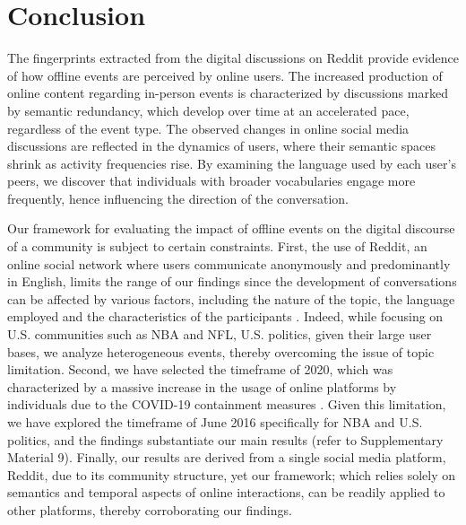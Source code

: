 \documentclass[fleqn,10pt]{wlscirep}
\begin{document}
\section*{Conclusion}

The fingerprints extracted from the digital discussions on Reddit provide evidence of how offline events are perceived by online users.
The increased production of online content regarding in-person events is characterized by discussions marked by semantic redundancy, which develop over time at an accelerated pace, regardless of the event type.
The observed changes in online social media discussions are reflected in the dynamics of users, where their semantic spaces shrink as activity frequencies rise.
By examining the language used by each user's peers, we discover that individuals with broader vocabularies engage more frequently, hence influencing the direction of the conversation. 

Our framework for evaluating the impact of offline events on the digital discourse of a community is subject to certain constraints.
First, the use of Reddit, an online social network where users communicate anonymously and predominantly in English, limits the range of our findings since the development of conversations can be affected by various factors, including the nature of the topic, the language employed and the characteristics of the participants \cite{stans2017role}.
Indeed, while focusing on U.S. communities such as NBA and NFL, U.S. politics, given their large user bases, we analyze heterogeneous events, thereby overcoming the issue of topic limitation.
Second, we have selected the timeframe of 2020, which was characterized by a massive increase in the usage of online platforms by individuals due to the COVID-19 containment measures \cite{ashokkumar2021social}.
Given this limitation, we have explored the timeframe of June 2016 specifically for NBA and U.S. politics, and the findings substantiate our main results (refer to Supplementary Material 9).
Finally, our results are derived from a single social media platform, Reddit, due to its community structure, 
yet our framework; which relies solely on semantics and temporal aspects of online interactions, can be readily applied to other platforms, thereby corroborating our findings.
\end{document}
